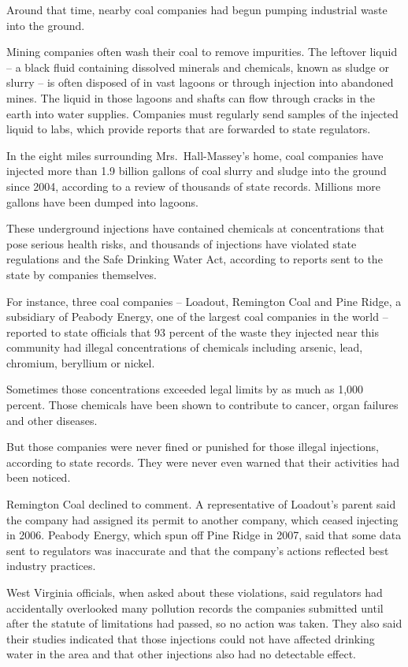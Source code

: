 ﻿\documentclass[12pt]{article}
\begin{document}
Around that time, nearby coal companies had begun pumping industrial waste into the ground.

Mining companies often wash their coal to remove impurities. The leftover liquid -- a black fluid
containing dissolved minerals and chemicals, known as sludge\cite{sludge} or slurry -- is often
disposed of in vast lagoons or through injection into abandoned mines. The liquid in those lagoons
and shafts can flow through cracks in the earth into water supplies. Companies must regularly send
samples of the injected liquid to labs, which provide reports that are forwarded to state
regulators.

In the eight miles surrounding Mrs.~Hall-Massey's home, coal companies have injected more than 1.9
billion gallons of coal slurry and sludge into the ground since 2004, according to a review of
thousands of state records. Millions more gallons have been dumped into lagoons.

These underground injections have contained chemicals at concentrations that pose serious health
risks, and thousands of injections have violated state regulations and the Safe Drinking Water Act,
according to reports sent to the state by companies themselves.

For instance, three coal companies -- Loadout, Remington Coal and Pine Ridge, a subsidiary of
Peabody Energy, one of the largest coal companies in the world -- reported to state officials that
93 percent of the waste they injected near this community had illegal concentrations of chemicals
including arsenic, lead, chromium, beryllium or nickel.

Sometimes those concentrations exceeded legal limits by as much as 1,000 percent. Those chemicals
have been shown to contribute to cancer, organ failures and other diseases.

But those companies were never fined or punished for those illegal injections, according to state
records. They were never even warned that their activities had been noticed.

Remington Coal declined to comment. A representative of Loadout's parent said the company had
assigned its permit to another company, which ceased injecting in 2006. Peabody Energy, which spun
off Pine Ridge in 2007, said that some data sent to regulators was inaccurate and that the company's
actions reflected best industry practices.

West Virginia officials, when asked about these violations, said regulators had accidentally
overlooked many pollution records the companies submitted until after the statute of limitations had
passed, so no action was taken. They also said their studies indicated that those injections could
not have affected drinking water in the area and that other injections also had no detectable
effect.
\end{document}
